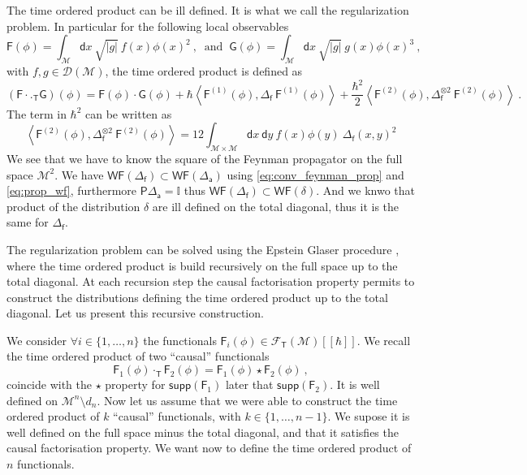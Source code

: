 \documentclass[11pt]{book}
\newcommand{\supp}{\mathsf{supp}}
\newcommand{\WF}{\mathsf{WF}}
\newcommand{\abs}[1]{\left|#1\right|}
\newcommand{\sm}[1]{\left\langle#1\right\rangle}
\newcommand{\Dcal}{\mathcal{D}}
\newcommand{\Fcal}{\mathcal{F}}
\newcommand{\Mcal}{\mathcal{M}}
\newcommand{\Ibb}{\mathbb{I}}
\newcommand{\Fsf}{\mathsf{F}}
\newcommand{\Gsf}{\mathsf{G}}
\newcommand{\Psf}{\mathsf{P}}
\newcommand{\Tsf}{\mathsf{T}}
\newcommand{\asf}{\mathsf{a}}
\newcommand{\dsf}{\mathsf{d}}
\newcommand{\fsf}{\mathsf{f}}
\theoremstyle{break}
\begin{document}
The time ordered product can be ill defined. It is what we call the regularization problem. In particular for the following local observables
%
\begin{equation*}
\Fsf(\phi) = \int_\Mcal \dsf x \ \sqrt{\abs{g}} \ f(x) \phi(x)^2 \ , \ \mbox{ and } \ 
\Gsf(\phi) = \int_\Mcal \dsf x \ \sqrt{\abs{g}} \ g(x) \phi(x)^3 \ ,
\end{equation*}
%
with $f, g \in \Dcal(\Mcal)$, the time ordered product is defined as
%
\begin{equation*}
(\Fsf \cdot._\Tsf \Gsf)(\phi) = \Fsf(\phi) \cdot \Gsf(\phi) + \hbar \sm{ \Fsf^{(1)}(\phi) , \Delta_\fsf \ \Fsf^{(1)}(\phi) } + \frac{\hbar^2}{2} \sm{ \Fsf^{(2)}(\phi) , \Delta_\fsf^{\otimes 2} \ \Fsf^{(2)}(\phi) } \ .
\end{equation*}
%
The term in $\hbar^2$ can be written as
%
\begin{equation*}
\sm{ \Fsf^{(2)}(\phi) , \Delta_\fsf^{\otimes 2} \ \Fsf^{(2)}(\phi) }  = 
12 \int_{\Mcal \times \Mcal} \dsf x \ \dsf y \ f(x) \phi(y) \ \Delta_\fsf(x,y)^2
\end{equation*}
%
We see that we have to know the square of the Feynman propagator on the full space $\Mcal^2$. We have $\WF(\Delta_\fsf) \subset \WF(\Delta_\asf)$ using \eqref{eq:conv_feynman_prop} and \eqref{eq:prop_wf}, furthermore $\Psf\Delta_\asf=\Ibb$ thus $\WF(\Delta_\fsf) \subset \WF(\delta)$. And we knwo that product of the distribution $\delta$ are ill defined on the total diagonal, thus it is the same for $\Delta_\fsf$.




The regularization problem can be solved using the Epstein Glaser procedure \cite{brunetti_microlocal_2000}, where the time ordered product is build recursively on the full space up to the total diagonal. At each recursion step the causal factorisation property permits to construct the distributions defining the time ordered product up to the total diagonal. Let us present this recursive construction. 




We consider $\forall i \in \{1,\dots,n\}$ the functionals $\Fsf_i(\phi) \in \Fcal_\Tsf(\Mcal)[[\hbar]]$. We recall the time ordered product of two ``causal'' functionals 
%
\begin{equation*}
\Fsf_1(\phi) \cdot_\Tsf \Fsf_2(\phi) = \Fsf_1(\phi) \star \Fsf_2(\phi) \ ,
\end{equation*}
%
coincide with the $\star$ property for $\supp(\Fsf_1)$ later that $\supp(\Fsf_2)$. It is well defined on $\Mcal^n \setminus d_n$. Now let us assume that we were able to construct the time ordered product of $k$ ``causal'' functionals, with $k \in \{1,\dots,n-1\}$. We supose it is well defined on the full space minus the total diagonal, and that it satisfies the causal factorisation property. We want now to define the time ordered product of $n$ functionals.
\end{document}
